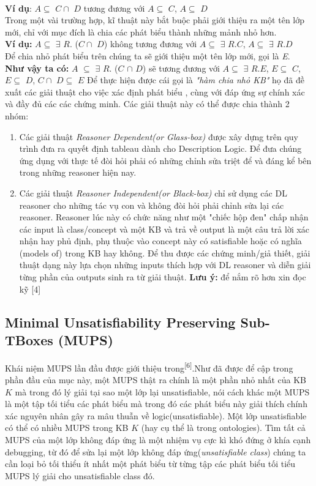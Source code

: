 \\\textbf{Ví dụ}:	 $A\subseteq$ $C\cap$ $D$ tương đương với $A\subseteq$ $C$, $A\subseteq$ $D$
\\
Trong một vài trường hợp, kĩ thuật này bắt buộc phải giới thiệu ra một tên lớp mới, chỉ với mục đích là chia các phát biểu thành những mảnh nhỏ hơn.
\\\textbf{Ví dụ:}	$A\subseteq$ $\exists$ $R.$ ($C\cap$ $D$) không tương đương với $A\subseteq$ $\exists$ $R.C$, $A\subseteq$ $\exists$ $R.D$
\\Để chia nhỏ phát biểu trên chúng ta sẽ giới thiệu một tên lớp mới, gọi là \textit{E}.
\\\textbf{Như vậy ta có:}
$A$ $\subseteq$ $\exists$ $R.$ ($C$ $\cap$ $D$) sẽ tương đương với $A\subseteq$ $\exists$ $R.E$, $E\subseteq$ $C$, $E\subseteq$ $D$, $C\cap$ $D\subseteq$ $E$
\hspace*{0.05\textwidth} Để thực hiện được cái gọi là \textit{"hàm chia nhỏ KB"} họ đã đề xuất các giải thuật cho việc xác định phát biểu , cùng với đáp ứng sự chính xác và đầy đủ các các chứng minh. Các giải thuật này có thể được chia thành 2 nhóm:
\begin{enumerate}
\item
Các giải thuật \textit{Reasoner Dependent(or Glass-box)} được xây dựng trên quy trình đưa ra quyết định tableau dành cho Description Logic. Để đưa chúng ứng dụng với thực tế đòi hỏi phải có những chỉnh sửa triệt để và đáng kể bên trong những reasoner hiện nay.
\item
Các giải thuật \textit{Reasoner Independent(or Black-box)} chỉ sử dụng các DL reasoner cho những tác vụ con và không đòi hỏi phải chỉnh sửa lại các reasoner. Reasoner lúc này có chức năng như một "chiếc hộp đen" chấp nhận các input là class/concept và một KB và trả về output là một câu trả lời xác nhận hay phủ định, phụ thuộc vào concept này có satisfiable hoặc có nghĩa (models of) trong KB hay không. Để thu được các chứng minh/giả thiết, giải thuật dạng này lựa chọn những inputs thích hợp với DL reasoner và diễn giải từng phần của outputs sinh ra từ giải thuật.
\textbf{Lưu ý:} để nắm rõ hơn xin đọc kỹ [4]
\end{enumerate}
\subsection{Minimal Unsatisfiability Preserving Sub-TBoxes (MUPS)}
Khái niệm MUPS lần đầu được giới thiệu trong\textsuperscript{[6]}.Như đã được để cập trong phần đầu của mục này, một MUPS thật ra chính là một phần nhỏ nhất của KB $K$ mà trong đó lý giải tại sao một lớp lại unsatisfiable, nói cách khác một MUPS là một tập tối tiểu các phát biểu mà trong đó các phát biểu này giải thích chính xác nguyên nhân gây ra mâu thuẫn về logic(unsatisfiable). Một lớp unsatisfiable có thể có nhiều MUPS trong KB $K$ (hay cụ thể là trong ontologies). Tìm tất cả MUPS của một lớp không đáp ứng là một nhiệm vụ cực kì khó đứng ở khía cạnh debugging, từ đó để sửa lại một lớp không đáp ứng(\textit{unsatisfiable class}) chúng ta cần loại bỏ tối thiểu ít nhất một phát biểu từ từng tập các phát biểu tối tiểu MUPS lý giải cho unsatisfiable class đó.
